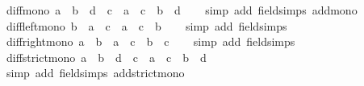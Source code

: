 \begin{isabellebody}
{\isafoldproof}%
%
\isadelimproof
\isanewline
%
\endisadelimproof
\isanewline
{}\isamarkupfalse%
\ diff{\isacharunderscore}{\kern0pt}mono{\isacharcolon}{\kern0pt}\ {\isachardoublequoteopen}a\ {\isasymle}\ b\ {\isasymLongrightarrow}\ d\ {\isasymle}\ c\ {\isasymLongrightarrow}\ a\ {\isacharminus}{\kern0pt}\ c\ {\isasymle}\ b\ {\isacharminus}{\kern0pt}\ d{\isachardoublequoteclose}\isanewline
%
\isadelimproof
\ \ %
\endisadelimproof
%
\isatagproof
{}\isamarkupfalse%
\ {\isacharparenleft}{\kern0pt}simp\ add{\isacharcolon}{\kern0pt}\ field{\isacharunderscore}{\kern0pt}simps\ add{\isacharunderscore}{\kern0pt}mono{\isacharparenright}{\kern0pt}%
\endisatagproof
{\isafoldproof}%
%
\isadelimproof
\isanewline
%
\endisadelimproof
\isanewline
{}\isamarkupfalse%
\ diff{\isacharunderscore}{\kern0pt}left{\isacharunderscore}{\kern0pt}mono{\isacharcolon}{\kern0pt}\ {\isachardoublequoteopen}b\ {\isasymle}\ a\ {\isasymLongrightarrow}\ c\ {\isacharminus}{\kern0pt}\ a\ {\isasymle}\ c\ {\isacharminus}{\kern0pt}\ b{\isachardoublequoteclose}\isanewline
%
\isadelimproof
\ \ %
\endisadelimproof
%
\isatagproof
{}\isamarkupfalse%
\ {\isacharparenleft}{\kern0pt}simp\ add{\isacharcolon}{\kern0pt}\ field{\isacharunderscore}{\kern0pt}simps{\isacharparenright}{\kern0pt}%
\endisatagproof
{\isafoldproof}%
%
\isadelimproof
\isanewline
%
\endisadelimproof
\isanewline
{}\isamarkupfalse%
\ diff{\isacharunderscore}{\kern0pt}right{\isacharunderscore}{\kern0pt}mono{\isacharcolon}{\kern0pt}\ {\isachardoublequoteopen}a\ {\isasymle}\ b\ {\isasymLongrightarrow}\ a\ {\isacharminus}{\kern0pt}\ c\ {\isasymle}\ b\ {\isacharminus}{\kern0pt}\ c{\isachardoublequoteclose}\isanewline
%
\isadelimproof
\ \ %
\endisadelimproof
%
\isatagproof
{}\isamarkupfalse%
\ {\isacharparenleft}{\kern0pt}simp\ add{\isacharcolon}{\kern0pt}\ field{\isacharunderscore}{\kern0pt}simps{\isacharparenright}{\kern0pt}%
\endisatagproof
{\isafoldproof}%
%
\isadelimproof
\isanewline
%
\endisadelimproof
\isanewline
{}\isamarkupfalse%
\ diff{\isacharunderscore}{\kern0pt}strict{\isacharunderscore}{\kern0pt}mono{\isacharcolon}{\kern0pt}\ {\isachardoublequoteopen}a\ {\isacharless}{\kern0pt}\ b\ {\isasymLongrightarrow}\ d\ {\isacharless}{\kern0pt}\ c\ {\isasymLongrightarrow}\ a\ {\isacharminus}{\kern0pt}\ c\ {\isacharless}{\kern0pt}\ b\ {\isacharminus}{\kern0pt}\ d{\isachardoublequoteclose}\isanewline
%
\isadelimproof
\ \ %
\endisadelimproof
%
\isatagproof
{}\isamarkupfalse%
\ {\isacharparenleft}{\kern0pt}simp\ add{\isacharcolon}{\kern0pt}\ field{\isacharunderscore}{\kern0pt}simps\ add{\isacharunderscore}{\kern0pt}strict{\isacharunderscore}{\kern0pt}mono{\isacharparenright}{\kern0pt}%

\end{isabellebody}

